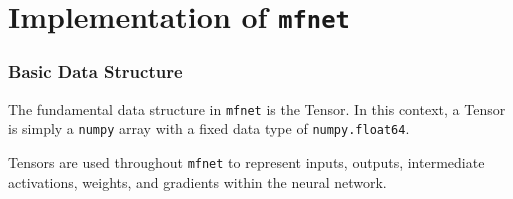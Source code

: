 \part{Implementation of \texttt{mfnet}}

\section{Basic Data Structure}

The fundamental data structure in \texttt{mfnet} is the Tensor. In this context, a Tensor is simply a \texttt{numpy}
array with a fixed data type of \texttt{numpy.float64}. 

Tensors are used throughout \texttt{mfnet} to represent inputs, outputs, intermediate activations, weights, and
gradients within the neural network.
